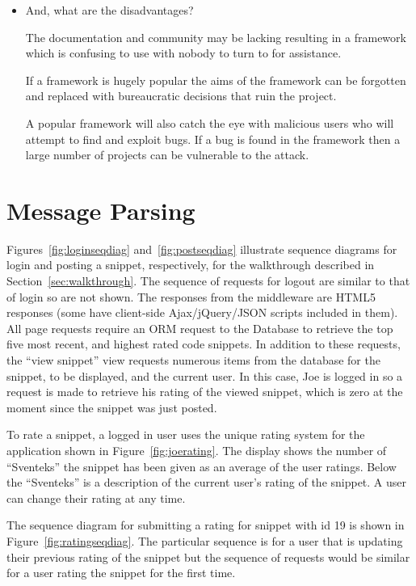 \documentclass{sig-alt-release2}
\begin{document}
\begin{itemize}
\item	And, what are the disadvantages?

The documentation and community may be lacking resulting in a framework which
is confusing to use with nobody to turn to for assistance.

If a framework is hugely popular the aims of the framework can be forgotten
and replaced with bureaucratic decisions that ruin the project.

A popular framework will also catch the eye with malicious users who will
attempt to find and exploit bugs. If a bug is found in the framework then a 
large number of projects can be vulnerable to the attack.

\end{itemize}

\section{Message Parsing}

Figures~\ref{fig:loginseqdiag} and~\ref{fig:postseqdiag} illustrate
sequence diagrams for login and posting a snippet, respectively,
for the walkthrough described in Section~\ref{sec:walkthrough}.
The sequence of requests for logout are similar to that of login so are
not shown. The responses from the middleware are HTML5 responses
(some have client-side Ajax/jQuery/JSON scripts included in them).
All page requests require an ORM request to
the Database to retrieve the top five most recent, and highest rated
code snippets. In addition to these requests, the
``view snippet'' view requests numerous items from the database for
the snippet, to be displayed, and the current user. In this
case, Joe is logged in so a request is made to retrieve his
rating of the viewed snippet, which is zero at the moment since the
snippet was just posted.

To rate a snippet, a logged in user uses the unique rating system for
the application shown in Figure~\ref{fig:joerating}. The display shows
the number of ``Sventeks'' the snippet has been given as an average of
the user ratings. Below the ``Sventeks'' is a description of the current
user's rating of the snippet. A user can change their rating at any time.

The sequence diagram for submitting a rating for snippet with id 19 is
shown in Figure~\ref{fig:ratingseqdiag}. The particular sequence is for
a user that is updating their previous rating of the snippet but the
sequence of requests would be similar for a user rating the snippet
for the first time.
\end{document}
